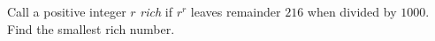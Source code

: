 Call a positive integer $r$ \emph{rich} if $r^r$ leaves remainder $216$ when divided by $1000$. Find the smallest rich number.

